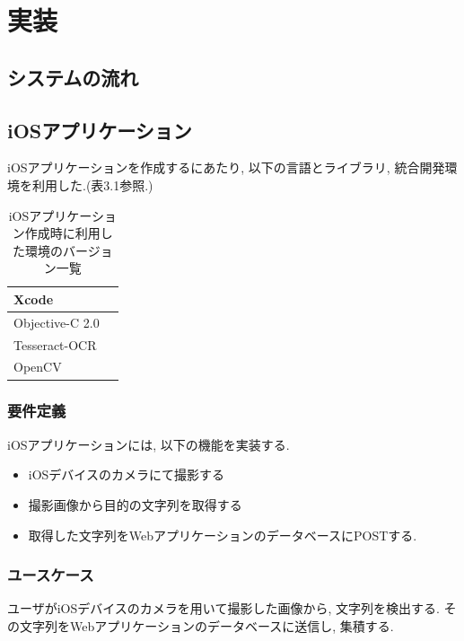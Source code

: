 \chapter{実装}
\label{chap:poordirection}

\section{システムの流れ}

\section{iOSアプリケーション}
iOSアプリケーションを作成するにあたり, 以下の言語とライブラリ, 統合開発環境を利用した.(表3.1参照.)

\begin{table}
\begin{center}
\begin{tabular}{|l|l|} \hline
Xcode &  \\ \hline
Objective-C 2.0 & \\ \hline
Tesseract-OCR & \\ \hline
OpenCV & \\ \hline
\end{tabular}
\end{center}
\caption{iOSアプリケーション作成時に利用した環境のバージョン一覧}
\end{table}

\subsection{要件定義}
iOSアプリケーションには, 以下の機能を実装する.
\begin{itemize}
\item iOSデバイスのカメラにて撮影する

\item 撮影画像から目的の文字列を取得する

\item 取得した文字列をWebアプリケーションのデータベースにPOSTする.
\end{itemize}

\subsection{ユースケース}
ユーザがiOSデバイスのカメラを用いて撮影した画像から, 文字列を検出する.
その文字列をWebアプリケーションのデータベースに送信し, 集積する.

